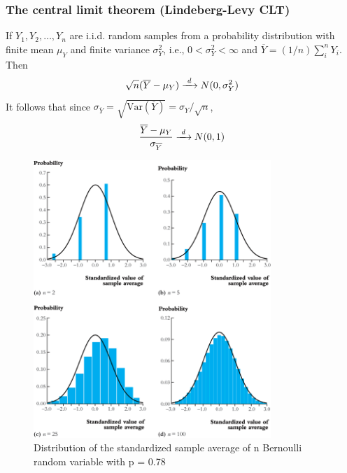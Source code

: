 \documentclass[a4paper,11pt]{article}
\newcommand{\var}{\mathrm{Var}}
\begin{document}
\subsubsection*{The central limit theorem (Lindeberg-Levy CLT)}
\label{sec:orgb84cffb}
If \(Y_1, Y_2, \ldots, Y_n\) are i.i.d. random samples from a
probability distribution with finite mean \(\mu_Y\) and finite variance
\(\sigma^2_Y\), i.e., \(0 < \sigma^2_Y < \infty\) and \(\overline{Y} =
(1/n)\sum_i^nY_i\). Then
\[ \sqrt{n}(\overline{Y}-\mu_Y) \xrightarrow{\text{ \textit d }} N(0,
\sigma^2_Y) \]
It follows that since \(\sigma_{\overline{Y}} =
\sqrt{\var(\overline{Y})} = \sigma_Y/\sqrt{n}\),
\[ \frac{\overline{Y} - \mu_Y}{\sigma_{\overline{Y}}}
\xrightarrow{\text{ \textit d }} N(0, 1) \]

\begin{figure}[htbp]
\centering
\includegraphics[width=0.8\textwidth]{figure/fig-2-9.png}
\caption{Distribution of the standardized sample average of n Bernoulli random variable with p = 0.78}
\end{figure}
\end{document}
